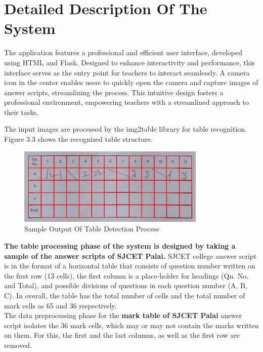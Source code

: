 \section{Detailed Description Of The System}

\noindent
The application features a professional and efficient user interface, developed using HTML and Flask. Designed to enhance interactivity and performance, this interface serves as the entry point for teachers to interact seamlessly. A camera icon in the center enables users to quickly open the camera and capture images of answer scripts, streamlining the process. This intuitive design fosters a professional environment, empowering teachers with a streamlined approach to their tasks.

\noindent The input images are processed by the img2table library for table recognition. Figure 3.3 shows the recognized table structure.

\begin{figure}[h!]
    \centering
    \includegraphics[width=0.8\textwidth]{Images/prop_sys/Img_with_redlines.jpg}
    \caption{Sample Output Of Table Detection Process}
\end{figure}

\clearpage

\noindent \textbf{The table processing phase of the system is designed by taking a sample of the answer scripts of SJCET Palai.} SJCET college answer script is in the format of a horizontal table that consists of question number written on the first row (13 cells), the first column is a place-holder for headings (Qn. No. and Total), and possible divisions of questions in each question number (A, B, C). In overall, the table has the total number of cells and the total number of mark cells as 65 and 36 respectively.\\ 

\noindent The data preprocessing phase for the \textbf{mark table of SJCET Palai} answer script isolates the 36 mark cells, which may or may not contain the marks written on them. For this, the first and the last columns, as well as the first row are removed.

